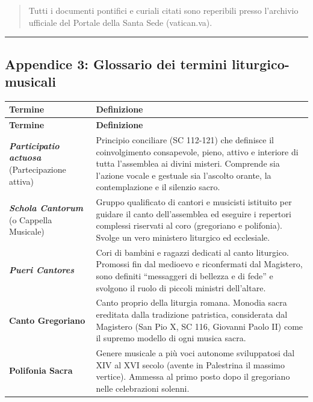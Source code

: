 \documentclass[12pt,a4paper]{article}
\begin{document}
	\begin{quote}
		Tutti i documenti pontifici e curiali citati sono reperibili presso l'archivio ufficiale del Portale della Santa Sede (vatican.va).
	\end{quote}
	
	\begin{center}\rule{0.5\linewidth}{0.5pt}\end{center}
	
	\subsection{Appendice 3: Glossario dei termini liturgico-musicali}\label{appendice-3-glossario-dei-termini-liturgico-musicali}
	
	\begin{longtable}{L{4cm}L{10cm}}
		\toprule
		\textbf{Termine} & \textbf{Definizione} \\
		\midrule
		\endfirsthead
		\toprule
		\textbf{Termine} & \textbf{Definizione} \\
		\midrule
		\endhead
		\bottomrule
		\endlastfoot
		\textbf{\emph{Participatio actuosa}} (Partecipazione attiva) & Principio conciliare (SC 112-121) che definisce il coinvolgimento consapevole, pieno, attivo e interiore di tutta l'assemblea ai divini misteri. Comprende sia l'azione vocale e gestuale sia l'ascolto orante, la contemplazione e il silenzio sacro. \\
		\textbf{\emph{Schola Cantorum}} (o Cappella Musicale) & Gruppo qualificato di cantori e musicisti istituito per guidare il canto dell'assemblea ed eseguire i repertori complessi riservati al coro (gregoriano e polifonia). Svolge un vero ministero liturgico ed ecclesiale. \\
		\textbf{\emph{Pueri Cantores}} & Cori di bambini e ragazzi dedicati al canto liturgico. Promossi fin dal medioevo e riconfermati dal Magistero, sono definiti ``messaggeri di bellezza e di fede'' e svolgono il ruolo di piccoli ministri dell'altare. \\
		\textbf{Canto Gregoriano} & Canto proprio della liturgia romana. Monodia sacra ereditata dalla tradizione patristica, considerata dal Magistero (San Pio X, SC 116, Giovanni Paolo II) come il supremo modello di ogni musica sacra. \\
		\textbf{Polifonia Sacra} & Genere musicale a più voci autonome sviluppatosi dal XIV al XVI secolo (avente in Palestrina il massimo vertice). Ammessa al primo posto dopo il gregoriano nelle celebrazioni solenni. \\

\end{longtable}
\end{document}
